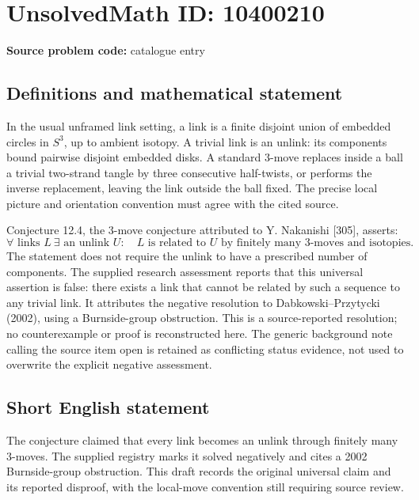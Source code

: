 \documentclass[11pt]{article}
\begin{document}
\section*{UnsolvedMath ID: 10400210}
\textbf{Source problem code:} catalogue entry
\subsection{Definitions and mathematical statement}
In the usual unframed link setting, a link is a finite disjoint union of embedded circles in \(S^3\), up to ambient isotopy. A trivial link is an unlink: its components bound pairwise disjoint embedded disks. A standard \(3\)-move replaces inside a ball a trivial two-strand tangle by three consecutive half-twists, or performs the inverse replacement, leaving the link outside the ball fixed. The precise local picture and orientation convention must agree with the cited source.

Conjecture 12.4, the \(3\)-move conjecture attributed to Y. Nakanishi [305], asserts:
\[
 \forall\text{ links }L\ \exists\text{ an unlink }U:\quad
 L\text{ is related to }U\text{ by finitely many }3\text{-moves and isotopies}.
\]
The statement does not require the unlink to have a prescribed number of components. The supplied research assessment reports that this universal assertion is false: there exists a link that cannot be related by such a sequence to any trivial link. It attributes the negative resolution to Dabkowski--Przytycki (2002), using a Burnside-group obstruction. This is a source-reported resolution; no counterexample or proof is reconstructed here. The generic background note calling the source item open is retained as conflicting status evidence, not used to overwrite the explicit negative assessment.
\subsection{Short English statement}
The conjecture claimed that every link becomes an unlink through finitely many \(3\)-moves. The supplied registry marks it solved negatively and cites a 2002 Burnside-group obstruction. This draft records the original universal claim and its reported disproof, with the local-move convention still requiring source review.
\end{document}
